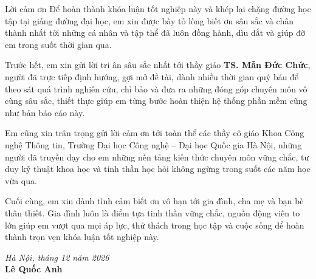 \documentclass{uetgraduation}
\begin{document}
\begin{preamble}{Lời cảm ơn}
Để hoàn thành khóa luận tốt nghiệp này và khép lại chặng đường học tập tại giảng đường đại học, em xin được bày tỏ lòng biết ơn sâu sắc và chân thành nhất tới những cá nhân và tập thể đã luôn đồng hành, dìu dắt và giúp đỡ em trong suốt thời gian qua.

Trước hết, em xin gửi lời tri ân sâu sắc nhất tới thầy giáo \textbf{TS. Mẫn Đức Chức}, người đã trực tiếp định hướng, gợi mở đề tài, dành nhiều thời gian quý báu để theo sát quá trình nghiên cứu, chỉ bảo và đưa ra những đóng góp chuyên môn vô cùng sâu sắc, thiết thực giúp em từng bước hoàn thiện hệ thống phần mềm cũng như bản báo cáo này.

Em cũng xin trân trọng gửi lời cảm ơn tới toàn thể các thầy cô giáo Khoa Công nghệ Thông tin, Trường Đại học Công nghệ -- Đại học Quốc gia Hà Nội, những người đã truyền dạy cho em những nền tảng kiến thức chuyên môn vững chắc, tư duy kỹ thuật khoa học và tinh thần học hỏi không ngừng trong suốt các năm học vừa qua.

Cuối cùng, em xin dành tình cảm biết ơn vô hạn tới gia đình, cha mẹ và bạn bè thân thiết. Gia đình luôn là điểm tựa tinh thần vững chắc, nguồn động viên to lớn giúp em vượt qua mọi áp lực, thử thách trong học tập và cuộc sống để hoàn thành trọn vẹn khóa luận tốt nghiệp này.

\vspace{1cm}
\begin{flushright}
\textit{Hà Nội, tháng 12 năm 2026}\\
\textbf{Lê Quốc Anh}
\end{flushright}
\end{preamble}
\end{document}
